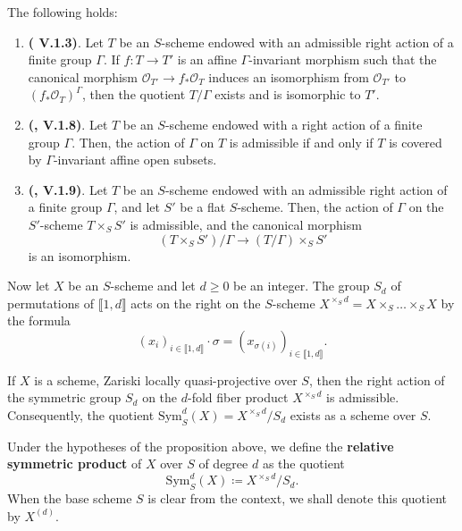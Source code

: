 \begin{prop}
    The following holds:
    \begin{enumerate}
        \item \textbf{(\cite{sga1} V.1.3)}. Let $T$ be an $S$-scheme endowed with an admissible right action of a finite group $\Gamma$. If $f : T \to T'$ is an affine $\Gamma$-invariant morphism such that the canonical morphism $\mathcal{O}_{T'} \to f_* \mathcal{O}_T$ induces an isomorphism from $\mathcal{O}_{T'}$ to $(f_* \mathcal{O}_T)^{\Gamma}$, then the quotient $T/\Gamma$ exists and is isomorphic to $T'$.
        \item \textbf{(\cite{sga1}, V.1.8)}. Let $T$ be an $S$-scheme endowed with a right action of a finite group $\Gamma$. Then, the action of $\Gamma$ on $T$ is admissible if and only if $T$ is covered by $\Gamma$-invariant affine open subsets.
        \item \textbf{(\cite{sga1}, V.1.9)}. Let $T$ be an $S$-scheme endowed with an admissible right action of a finite group $\Gamma$, and let $S'$ be a flat $S$-scheme. Then, the action of $\Gamma$ on the $S'$-scheme $T \times_S S'$ is admissible, and the canonical morphism
            \[
            (T \times_S S')/\Gamma \to (T/\Gamma) \times_S S'
            \]
            is an isomorphism.
    \end{enumerate}
\end{prop}



Now let $X$ be an $S$-scheme and let $d \geq 0$ be an integer. The group ${S}_d$ of permutations of $\llbracket 1, d \rrbracket$ acts on the right on the $S$-scheme $X^{\times_S d} = X \times_S \dots \times_S X$ by the formula
\[
(x_i)_{i \in \llbracket 1, d \rrbracket} \cdot \sigma = (x_{\sigma(i)})_{i \in \llbracket 1, d \rrbracket}.
\]

\begin{prop}
    If $X$ is a scheme, Zariski locally quasi-projective over $S$, then the right action of the symmetric group $S_d$ on the $d$-fold fiber product 
    $X^{\times_S d}$ is admissible. 
    Consequently, the quotient $\mathrm{Sym}_S^d(X) = X^{\times_S d}/S_d$ exists as a scheme over $S$.
\end{prop}

\begin{definition}
    Under the hypotheses of the proposition above, we define the \textbf{relative symmetric product} of $X$ over $S$ 
    of degree $d$ as the quotient
    $$\mathrm{Sym}_S^d(X) \coloneqq X^{\times_S d}/S_d.$$
    When the base scheme $S$ is clear from the context, we shall denote this quotient by 
    $X^{(d)}$.
\end{definition}


